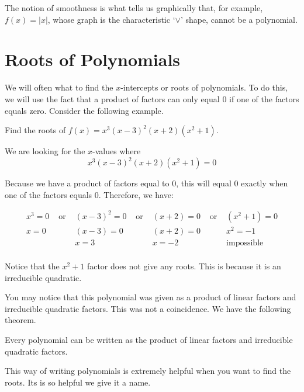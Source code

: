 \documentclass{ximera}
\begin{document}
The notion of smoothness is what tells us graphically that, for example, $f(x) = |x|$, whose graph is the characteristic `$\vee$' shape, cannot be a polynomial. 

\section{Roots of Polynomials}

We will often what to find the $x$-intercepts or roots of polynomials.  To do this, we will use the fact that a product of factors can only equal 0 if one of the factors equals zero.  Consider the following example.

\begin{example}
 Find the roots of $f(x) = x^3 (x-3)^2 (x+2) \left(x^2+1\right)$.

\begin{explanation}
We are looking for the $x$-values where 
\[
x^3 (x-3)^2 (x+2) \left(x^2+1\right)=0
\]

Because we have a product of factors equal to 0, this will equal 0 exactly when one of the factors equals 0.  Therefore, we have:

\renewcommand*{\arraystretch}{1.2}
\setlength{\arrayrulewidth}{0.5mm}
\setlength{\tabcolsep}{18pt}
\[
\begin{array}{ccccccc}
x^3=0 & \text{  or  } &  (x-3)^2=0 & \text{  or  } &  (x+2)=0 & \text{  or  } &  (x^2+1)=0 \\
x=0 &  &  (x-3)=0 & \ &  (x+2)=0 & &  x^2=-1 \\
 &  &  x=3 & \ &  x=-2 & &  \text{impossible} \\
\end{array}
\]

Notice that the $x^2+1$ factor does not give any roots.  This is because it is an irreducible quadratic.
\end{explanation}
\end{example}

You may notice that this polynomial was given as a product of linear factors and irreducible quadratic factors.  This was not a coincidence.  We have the following theorem.

\begin{theorem}
Every polynomial can be written as the product of linear factors and irreducible quadratic factors.
\end{theorem}

This way of writing polynomials is extremely helpful when you want to find the roots.  Its is so helpful we give it a name.
\end{document}

